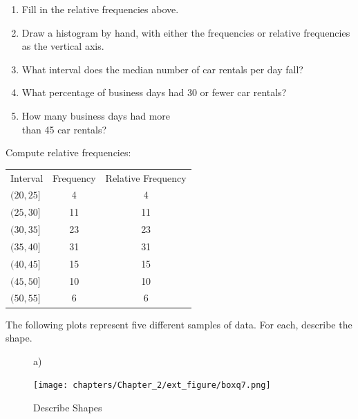 \documentclass[11pt, chapterprefix=true]{scrbook}\usepackage[]{graphicx}\usepackage[]{color}
\begin{document}
\begin{exercises}
\begin{exercise}
\begin{enumerate}
\item Fill in the relative frequencies above.
\item	Draw a histogram by hand, with either the frequencies or relative frequencies as the vertical axis.
\item	What interval does the median number of car rentals per day fall?
\item What percentage of business days had 30 or fewer car rentals?
\item	How many business days had more \\ than 45 car rentals?
\end{enumerate}


	\end{exercise}
	\begin{solution}  %


Compute relative frequencies:

\begin{tabular}{@{} lcc @{}} \hline
Interval  &  Frequency &	Relative Frequency \\
$(20, 25]$ 	&     4 & 4  \\
$(25, 30]$ 	&    11 & 11 \\
$(30, 35]$ 	&    23 & 23 \\
$(35, 40]$ 	&    31 & 31 \\
$(40, 45]$ 	&    15 & 15 \\
$(45, 50]$ 	&    10 & 10 \\
$(50, 55]$ 	&     6 & 6 \\ \hline
\end{tabular}


	\end{solution}

\begin{exercise}  %

The following plots represent five different samples of data. For each, describe the shape.

\begin{figure}[ht]
  \caption{Describe Shapes}

\begin{minipage}[ht]{3cm}

  a)

  \texttt{[image: chapters/Chapter\_2/ext\_figure/boxq7.png]}
  \end{minipage} \hfill
  \begin{minipage}[ht]{3cm}


\end{minipage}
\end{figure}
\end{exercise}
\end{exercises}
\end{document}
